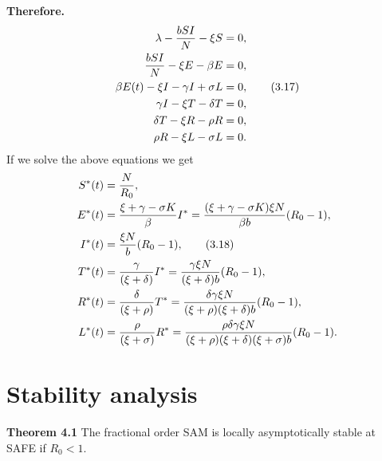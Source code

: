 \documentclass[10pt]{NSP1}
\begin{document}
\textbf{Therefore.} 
\begin{align}
\lambda - \frac{b S I}{N} - \xi S &= 0, \notag \\
\frac{b S I}{N} - \xi E - \beta E &= 0, \notag \\
\beta E(t) - \xi I - \gamma I + \sigma L &= 0, \tag{3.17} \\
\gamma I - \xi T - \delta T &= 0, \notag \\
\delta T - \xi R - \rho R &= 0, \notag \\
\rho R - \xi L - \sigma L &= 0.  \notag
\end{align}
If we solve the above equations we get
\begin{align}
S^\ast(t) &= \frac{N}{R_0}, \notag \\
E^\ast(t) &= \frac{\xi + \gamma - \sigma K}{\beta} I^\ast = \frac{(\xi + \gamma - \sigma K)\xi N}{\beta b} (R_0 - 1), \notag \\
I^\ast(t) &= \frac{\xi N}{b} (R_0 - 1), \tag{3.18} \\
T^\ast(t) &= \frac{\gamma}{(\xi + \delta)} I^\ast = \frac{\gamma \xi N}{(\xi + \delta)b} (R_0 - 1), \notag \\
R^\ast(t) &= \frac{\delta}{(\xi + \rho)} T^\ast = \frac{\delta \gamma \xi N}{(\xi + \rho)(\xi + \delta)b} (R_0 - 1), \notag \\
L^\ast(t) &= \frac{\rho}{(\xi + \sigma)} R^\ast = \frac{\rho \delta \gamma \xi N}{(\xi + \rho)(\xi + \delta)(\xi + \sigma) b} (R_0 - 1). \notag
\end{align}



\section{\bfseries Stability analysis}

\textbf{Theorem 4.1} The fractional order SAM is locally asymptotically stable at SAFE if $R_0 < 1$.
\end{document}
